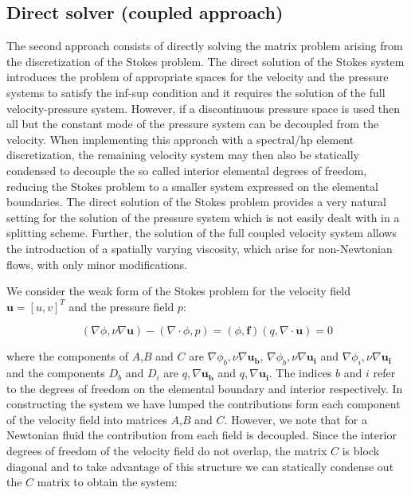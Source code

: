\subsection{Direct solver (coupled approach)}
\label{DirectSolv}
The second approach consists of directly solving the matrix problem
arising from the discretization of the Stokes problem.  The direct
solution of the Stokes system introduces the problem of appropriate
spaces for the velocity and the pressure systems to satisfy the
inf-sup condition and it requires the solution of the full
velocity-pressure system. However, if a discontinuous pressure space
is used then all but the constant mode of the pressure system can be
decoupled from the velocity. When implementing this
approach with a spectral/hp element discretization, the remaining
velocity system may then also be statically condensed to decouple the so
called interior elemental degrees of freedom, reducing the Stokes
problem to a smaller system expressed on the elemental boundaries. The
direct solution of the Stokes problem provides a very natural setting
for the solution of the pressure system which is not easily dealt with
in a splitting scheme. Further, the solution of the full coupled
velocity system allows the introduction of a spatially varying
viscosity, which arise for non-Newtonian flows, with only minor
modifications.

We consider the weak form of the Stokes problem for the velocity field
$\boldsymbol{u}=[u,v]^{T}$ and the pressure field $p$:

\begin{subequations}
\begin{equation}
 (\nabla \phi,\nu \nabla \boldsymbol{u}) - (\nabla\cdot\phi,p)=(\phi,\boldsymbol{f})
\end{equation}
\begin{equation}
 (q,\nabla \cdot \boldsymbol{u}) = 0
\end{equation}
\end{subequations}

where the components of $A$,$B$ and $C$ are
$\nabla\phi_b,\nu\nabla\boldsymbol{u_b}$,
$\nabla\phi_b,\nu\nabla\boldsymbol{u_i}$ and
$\nabla\phi_i,\nu\nabla\boldsymbol{u_i}$ and the components $D_b$ and
$D_i$ are $q,\nabla\boldsymbol{u_b}$ and $q,\nabla\boldsymbol{u_i}$.
The indices $b$ and $i$ refer to the degrees of freedom on the
elemental boundary and interior respectively. In constructing the
system we have lumped the contributions form each component of the
velocity field into matrices $A$,$B$ and $C$. However, we note that
for a Newtonian fluid the contribution from each field is
decoupled. Since the interior degrees of freedom of the velocity field
do not overlap, the matrix $C$ is block diagonal and to take advantage
of this structure we can statically condense out the $C$ matrix to
obtain the system:


